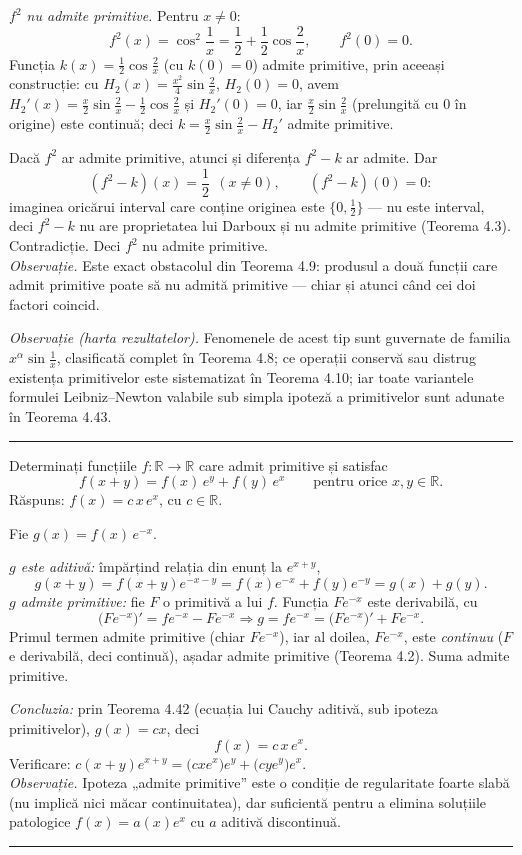 \emph{$f^2$ nu admite primitive.} Pentru $x\neq0$:
\[ f^2(x)=\cos^2\frac1x=\frac12+\frac12\cos\frac2x,\qquad f^2(0)=0 . \]
Funcția $k(x)=\frac12\cos\frac2x$ (cu $k(0)=0$) admite primitive, prin aceeași construcție: cu $H_2(x)=\frac{x^2}{4}\sin\frac2x$, $H_2(0)=0$, avem $H_2'(x)=\frac x2\sin\frac2x-\frac12\cos\frac2x$ și $H_2'(0)=0$, iar $\frac x2\sin\frac 2x$ (prelungită cu $0$ în origine) este continuă; deci $k=\frac x2\sin\frac2x-H_2'$ admite primitive.

Dacă $f^2$ ar admite primitive, atunci și diferența $f^2-k$ ar admite. Dar
\[ (f^2-k)(x)=\frac12\ \ (x\neq0),\qquad (f^2-k)(0)=0 : \]
imaginea oricărui interval care conține originea este $\{0,\frac12\}$ --- nu este interval, deci $f^2-k$ nu are proprietatea lui Darboux și nu admite primitive (Teorema 4.3). Contradicție. Deci $f^2$ nu admite primitive.\\[2pt]
\emph{Observație.} Este exact obstacolul din Teorema 4.9: produsul a două funcții care admit primitive poate să nu admită primitive --- chiar și atunci când cei doi factori coincid.

\emph{Observație (harta rezultatelor).} Fenomenele de acest tip sunt guvernate de familia $x^{\alpha}\sin\frac1x$, clasificată complet în Teorema 4.8; ce operații conservă sau distrug existența primitivelor este sistematizat în Teorema 4.10; iar toate variantele formulei Leibniz--Newton valabile sub simpla ipoteză a primitivelor sunt adunate în Teorema 4.43.
\vspace{1mm}\hrule

Determinați funcțiile $f:\mathbb{R}\to\mathbb{R}$ care admit primitive și satisfac
\[ f(x+y)=f(x)\,e^y+f(y)\,e^x\qquad\text{pentru orice }x,y\in\mathbb{R}. \]
\sol Răspuns: $f(x)=c\,x\,e^x$, cu $c\in\mathbb{R}$.

Fie $g(x)=f(x)\,e^{-x}$.

\emph{$g$ este aditivă:} împărțind relația din enunț la $e^{x+y}$,
\[ g(x+y)=f(x+y)e^{-x-y}=f(x)e^{-x}+f(y)e^{-y}=g(x)+g(y) . \]
\emph{$g$ admite primitive:} fie $F$ o primitivă a lui $f$. Funcția $Fe^{-x}$ este derivabilă, cu
\[ \bigl(Fe^{-x}\bigr)'=fe^{-x}-Fe^{-x} \Longrightarrow g=fe^{-x}=\bigl(Fe^{-x}\bigr)'+Fe^{-x} . \]
Primul termen admite primitive (chiar $Fe^{-x}$), iar al doilea, $Fe^{-x}$, este \emph{continuu} ($F$ e derivabilă, deci continuă), așadar admite primitive (Teorema 4.2). Suma admite primitive.

\emph{Concluzia:} prin Teorema 4.42 (ecuația lui Cauchy aditivă, sub ipoteza primitivelor), $g(x)=cx$, deci
\[ f(x)=c\,x\,e^x . \]
Verificare: $c(x+y)e^{x+y}=\bigl(cxe^x\bigr)e^y+\bigl(cye^y\bigr)e^x$. \checkmark\\[2pt]
\emph{Observație.} Ipoteza „admite primitive'' este o condiție de regularitate foarte slabă (nu implică nici măcar continuitatea), dar suficientă pentru a elimina soluțiile patologice $f(x)=a(x)e^x$ cu $a$ aditivă discontinuă.
\vspace{1mm}\hrule

